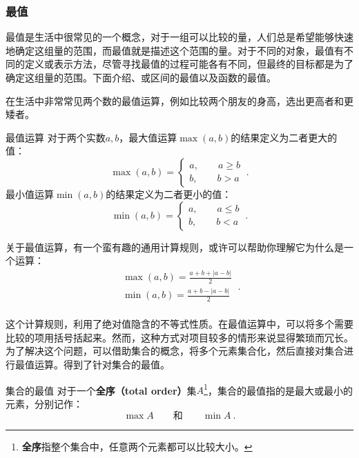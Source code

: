 \subsubsection{最值}

最值是生活中很常见的一个概念，对于一组可以比较的量，人们总是希望能够快速地确定这组量的范围，而最值就是描述这个范围的量。对于不同的对象，最值有不同的定义或表示方法，尽管寻找最值的过程可能各有不同，但最终的目标都是为了确定这组量的范围。下面介绍、或区间的最值以及函数的最值。

在生活中非常常见两个数的最值运算，例如比较两个朋友的身高，选出更高者和更矮者。

\begin{definition}{最值运算}
对于两个实数$a,b$，最大值运算$\max(a,b)$的结果定义为二者更大的值：
\begin{equation}
\max(a,b)=\begin{cases}
a,\qquad a\geq b\\
b,\qquad b>a
\end{cases}~.
\end{equation}
最小值运算$\min(a,b)$的结果定义为二者更小的值：
\begin{equation}
\min(a,b)=\begin{cases}
a,\qquad a\leq b\\
b,\qquad b<a
\end{cases}~.
\end{equation}
\end{definition}

关于最值运算，有一个蛮有趣的通用计算规则，或许可以帮助你理解它为什么是一个运算：
\begin{equation}
\begin{array}{c} 
\max(a, b) = \frac{a + b + |a - b|}{2} \\  
\min(a, b) = \frac{a + b - |a - b|}{2} \\  
\end{array}~.
\end{equation}

这个计算规则，利用了绝对值隐含的不等式性质。在最值运算中，可以将多个需要比较的项用括号括起来。然而，这种方式对项目较多的情形来说显得繁琐而冗长。为了解决这个问题，可以借助集合的概念，将多个元素集合化，然后直接对集合进行最值运算。得到了针对集合的最值。

\begin{definition}{集合的最值}
对于一个\textbf{全序（total order）}集$A$\footnote{\textbf{全序}指整个集合中，任意两个元素都可以比较大小。}，集合的最值指的是最大或最小的元素，分别记作：
\begin{equation}
\max A\qquad\text{和}\qquad\min A~.
\end{equation}
\end{definition}

